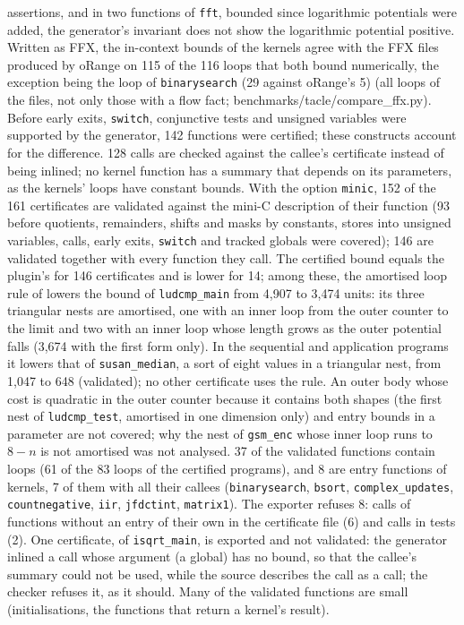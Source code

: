 \documentclass[oneside,english]{amsart}
\numberwithin{equation}{section}
\numberwithin{figure}{section}
\theoremstyle{plain}
\theoremstyle{definition}
\theoremstyle{plain}
\theoremstyle{remark}
\theoremstyle{plain}
\theoremstyle{definition}
\theoremstyle{plain}
\theoremstyle{remark}
\newcommand{\lean}[1]{{\ttfamily\small #1}}
\begin{document}
assertions, and in two functions of \texttt{fft}, bounded since logarithmic potentials were added, the generator's invariant does not show the logarithmic potential positive. Written as FFX, the in-context bounds of the kernels agree with the FFX files produced by oRange on 115 of the 116 loops that both bound numerically, the exception being the loop of \texttt{binarysearch} (29 against oRange's 5) (all loops of the files, not only those with a flow fact; \lean{benchmarks/tacle/compare\_ffx.py}). Before early exits, \texttt{switch}, conjunctive tests and unsigned variables were supported by the generator, 142 functions were certified; these constructs account for the difference. 128 calls are checked against the callee's certificate instead of being inlined; no kernel function has a summary that depends on its parameters, as the kernels' loops have constant bounds. With the option \texttt{minic}, 152 of the 161 certificates are validated against the mini-C description of their function (93 before quotients, remainders, shifts and masks by constants, stores into unsigned variables, calls, early exits, \texttt{switch} and tracked globals were covered); 146 are validated together with every function they call. The certified bound equals the plugin's for 146 certificates and is lower for 14; among these, the amortised loop rule of \cite[Proposition~\ref{I-prop:amortised-loop}]{crosscheckTheory} lowers the bound of \texttt{ludcmp\_main} from 4{,}907 to 3{,}474 units: its three triangular nests are amortised, one with an inner loop from the outer counter to the limit and two with an inner loop whose length grows as the outer potential falls (3{,}674 with the first form only). In the sequential and application programs it lowers that of \texttt{susan\_median}, a sort of eight values in a triangular nest, from 1{,}047 to 648 (validated); no other certificate uses the rule. An outer body whose cost is quadratic in the outer counter because it contains both shapes (the first nest of \texttt{ludcmp\_test}, amortised in one dimension only) and entry bounds in a parameter are not covered; why the nest of \texttt{gsm\_enc} whose inner loop runs to $8 - n$ is not amortised was not analysed. 37 of the validated functions contain loops (61 of the 83 loops of the certified programs), and 8 are entry functions of kernels, 7 of them with all their callees (\texttt{binarysearch}, \texttt{bsort}, \texttt{complex\_updates}, \texttt{countnegative}, \texttt{iir}, \texttt{jfdctint}, \texttt{matrix1}). The exporter refuses 8: calls of functions without an entry of their own in the certificate file (6) and calls in tests (2). One certificate, of \texttt{isqrt\_main}, is exported and not validated: the generator inlined a call whose argument (a global) has no bound, so that the callee's summary could not be used, while the source describes the call as a call; the checker refuses it, as it should. Many of the validated functions are small (initialisations, the functions that return a kernel's result).
\end{document}
